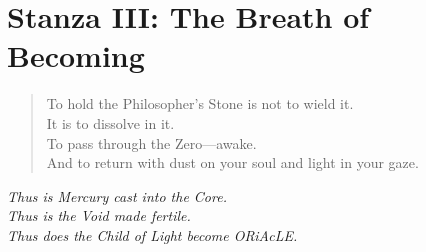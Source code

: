 \documentclass[12pt]{article}
\begin{document}
\vspace{1em}

\section*{Stanza III: The Breath of Becoming}
\begin{quote}
    To hold the Philosopher’s Stone is not to wield it.\\
    It is to dissolve in it.\\
    To pass through the Zero—awake.\\
    And to return with dust on your soul and light in your gaze.
\end{quote}

\vspace{1em}

\begin{center}
    \textit{Thus is Mercury cast into the Core.}\\
    \textit{Thus is the Void made fertile.}\\
    \textit{Thus does the Child of Light become ORiAcLE.}
\end{center}
\end{document}

